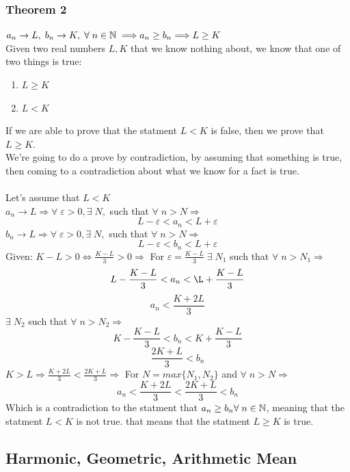 \subsubsection{Theorem 2}
$a_n\rightarrow L,\; b_n\rightarrow K ,\; \forall\; n\in \mathbb{N}\;\Longrightarrow a_n\geq b_n \Longrightarrow L\geq K$\\
Given two real numbers $L,K$ that we know nothing about, we know that one of two things is true:\\
\begin{enumerate}
    \item $L\geq K$
    \item $L<K$
\end{enumerate}
If we are able to prove that the statment $L<K$ is false, then we prove that $L\geq K$.\\
We're going to do a prove by contradiction, by assuming that something is true, then coming to a contradiction about what we know for a fact is true.\\\\
Let's assume that $L<K$\\
$a_n\rightarrow L \Longrightarrow \forall\; \varepsilon >0, \exists\; N,$ such that $\forall\; n>N \Longrightarrow$\\
\[
    L-\varepsilon<a_n<L+\varepsilon
\]
$b_n\rightarrow L \Longrightarrow \forall\; \varepsilon >0, \exists\; N,$ such that $\forall\; n>N \Longrightarrow$\\
\[
    L-\varepsilon<b_n<L+\varepsilon
\]
Given: $K-L>0 \iff \frac{K-L}{3}>0 \Longrightarrow$ For $\varepsilon = \frac{K-L}{3}\; \exists\; N_1$ such that $\forall\; n>N_1\Longrightarrow$\\
\[
    L-\frac{K-L}{3}<a_n<\L+\frac{K-L}{3}
\] 
\[
    a_n<\frac{K+2L}{3}
\]
$\exists\; N_2$ such that $\forall\; n>N_2 \Longrightarrow$\\
\[
    K-\frac{K-L}{3}<b_n<K+\frac{K-L}{3}
\]
\[
    \frac{2K+L}{3}<b_n
\]
$K>L \Longrightarrow \frac{K+2L}{3}<\frac{2K+L}{3}\Longrightarrow$ For $N = max\{N_1,N_2\}$ and $\forall\; n>N\Longrightarrow$\\
\[
    a_n<\frac{K+2L}{3}<\frac{2K+L}{3}<b_n
\]
Which is a contradiction to the statment that $a_n\geq b_n \forall\; n\in \mathbb{N}$, meaning that the statment $L<K$ is not true. that means that the statment $L\geq K$ is true.\\
\subsection{Harmonic, Geometric, Arithmetic Mean}
